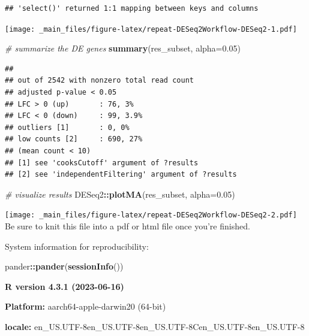 \documentclass[
]{book}
\newenvironment{Shaded}{\begin{snugshade}}{\end{snugshade}}
\newcommand{\AttributeTok}[1]{\textcolor[rgb]{0.13,0.29,0.53}{#1}}
\newcommand{\CommentTok}[1]{\textcolor[rgb]{0.56,0.35,0.01}{\textit{#1}}}
\newcommand{\FloatTok}[1]{\textcolor[rgb]{0.00,0.00,0.81}{#1}}
\newcommand{\FunctionTok}[1]{\textcolor[rgb]{0.13,0.29,0.53}{\textbf{#1}}}
\newcommand{\NormalTok}[1]{#1}
\newcommand{\SpecialCharTok}[1]{\textcolor[rgb]{0.81,0.36,0.00}{\textbf{#1}}}
\begin{document}
\begin{verbatim}
## 'select()' returned 1:1 mapping between keys and columns
\end{verbatim}

\texttt{[image: \_main\_files/figure-latex/repeat-DESeq2Workflow-DESeq2-1.pdf]}

\begin{Shaded}
\begin{Highlighting}[]
\CommentTok{\# summarize the DE genes}
\FunctionTok{summary}\NormalTok{(res\_subset, }\AttributeTok{alpha=}\FloatTok{0.05}\NormalTok{)}
\end{Highlighting}
\end{Shaded}

\begin{verbatim}
## 
## out of 2542 with nonzero total read count
## adjusted p-value < 0.05
## LFC > 0 (up)       : 76, 3%
## LFC < 0 (down)     : 99, 3.9%
## outliers [1]       : 0, 0%
## low counts [2]     : 690, 27%
## (mean count < 10)
## [1] see 'cooksCutoff' argument of ?results
## [2] see 'independentFiltering' argument of ?results
\end{verbatim}

\begin{Shaded}
\begin{Highlighting}[]
\CommentTok{\# visualize results}
\NormalTok{DESeq2}\SpecialCharTok{::}\FunctionTok{plotMA}\NormalTok{(res\_subset, }\AttributeTok{alpha=}\FloatTok{0.05}\NormalTok{)}
\end{Highlighting}
\end{Shaded}

\texttt{[image: \_main\_files/figure-latex/repeat-DESeq2Workflow-DESeq2-2.pdf]}
Be sure to knit this file into a pdf or html file once you're finished.

System information for reproducibility:

\begin{Shaded}
\begin{Highlighting}[]
\NormalTok{pander}\SpecialCharTok{::}\FunctionTok{pander}\NormalTok{(}\FunctionTok{sessionInfo}\NormalTok{())}
\end{Highlighting}
\end{Shaded}

\textbf{R version 4.3.1 (2023-06-16)}

\textbf{Platform:} aarch64-apple-darwin20 (64-bit)

\textbf{locale:}
en\_US.UTF-8\textbar\textbar en\_US.UTF-8\textbar\textbar en\_US.UTF-8\textbar\textbar C\textbar\textbar en\_US.UTF-8\textbar\textbar en\_US.UTF-8
\end{document}

